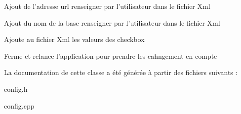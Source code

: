 Ajout de l'adresse url renseigner par l'utilisateur dans le fichier Xml

Ajout du nom de la base renseigner par l'utilisateur dans le fichier Xml

Ajoute au fichier Xml les valeurs des checkbox

Ferme et relance l'application pour prendre les cahngement en compte 

La documentation de cette classe a été générée à partir des fichiers suivants \-:\begin{DoxyCompactItemize}
\item 
config.\-h\item 
config.\-cpp\end{DoxyCompactItemize}
